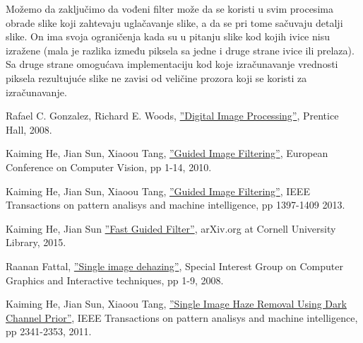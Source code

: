 \documentclass[a4paper,12pt,titlepage]{article}
\begin{document}
Možemo da zaključimo da vođeni filter može da se koristi u svim procesima obrade slike koji zahtevaju uglačavanje slike, a da se pri tome sačuvaju detalji slike. On ima svoja ograničenja kada su u pitanju slike kod kojih ivice nisu izražene (mala je razlika između piksela sa jedne i druge strane ivice ili prelaza). Sa druge strane omogućava implementaciju kod koje izračunavanje vrednosti piksela rezultujuće slike ne zavisi od veličine prozora koji se koristi za izračunavanje.

\newpage
{}
\begin{thebibliography}{10}

Rafael C. Gonzalez, Richard E. Woods,
\href{https://books.google.rs/books?id=8uGOnjRGEzoC&redir_esc=y}{''Digital Image Processing''},
Prentice Hall,
2008.

Kaiming He, Jian Sun, Xiaoou Tang,
\href{http://kaiminghe.com/publications/eccv10guidedfilter.pdf}{''Guided Image Filtering''},
European Conference on Computer Vision, pp 1-14,
2010.

Kaiming He, Jian Sun, Xiaoou Tang,
\href{http://kaiminghe.com/publications/pami12guidedfilter.pdf}{''Guided Image Filtering''},
IEEE Transactions on pattern analisys and machine intelligence, pp 1397-1409
2013.

Kaiming He, Jian Sun
\href{https://arxiv.org/pdf/1505.00996.pdf}{''Fast Guided Filter''},
arXiv.org at Cornell University Library,
2015.

Raanan Fattal,
\href{http://citeseerx.ist.psu.edu/viewdoc/download?doi=10.1.1.456.2558&rep=rep1&type=pdf}{''Single image dehazing''},
Special Interest Group on Computer Graphics and Interactive techniques, pp 1-9,
2008.

Kaiming He, Jian Sun, Xiaoou Tang,
\href{http://citeseerx.ist.psu.edu/viewdoc/download?doi=10.1.1.456.2558&rep=rep1&type=pdf}{''Single Image Haze Removal
Using Dark Channel Prior''},
IEEE Transactions on pattern analisys and machine intelligence, pp 2341-2353,
2011.

\end{thebibliography}
\end{document}
